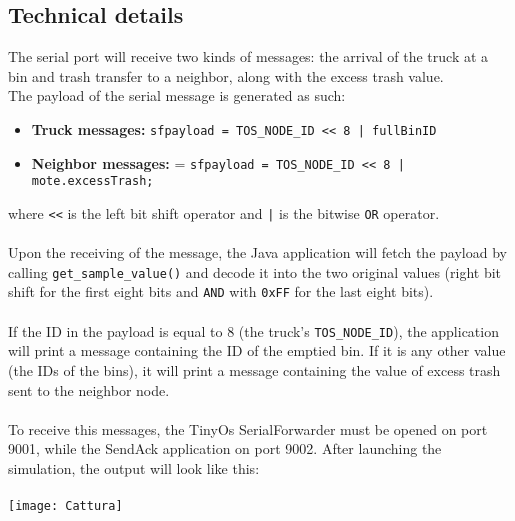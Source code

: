\documentclass[a4paper,10pt]{article}
\begin{document}
\subsection{Technical details}
The serial port will receive two kinds of messages: the arrival of the truck at a bin and trash transfer to a neighbor, along with the excess trash value.
\\The payload of the serial message is generated as such:
\begin{itemize}
	\item \textbf{Truck messages:} \texttt{sfpayload = TOS\_NODE\_ID << 8 | fullBinID}
	\item \textbf{Neighbor messages:} = \texttt{sfpayload = TOS\_NODE\_ID << 8 | mote.excessTrash;}
\end{itemize}
where \texttt{<<} is the left bit shift operator and \texttt{|} is the bitwise \texttt{OR} operator.
\\ \\Upon the receiving of the message, the Java application will fetch the payload by calling \texttt{get\_sample\_value()} and decode it into the two original values (right bit shift for the first eight bits and \texttt{AND} with \texttt{0xFF} for the last eight bits).
\\ \\  \noindent If the ID in the payload is equal to 8 (the truck's \texttt{TOS\_NODE\_ID}), the application will print a message containing the ID of the emptied bin. If it is any other value (the IDs of the bins), it will print a message containing the value of excess trash sent to the neighbor node. \\ \\
To receive this messages, the TinyOs SerialForwarder must be opened on port 9001, while the SendAck application on port 9002. After launching the simulation, the output will look like this: \\ \\
\texttt{[image: Cattura]}
\end{document}

